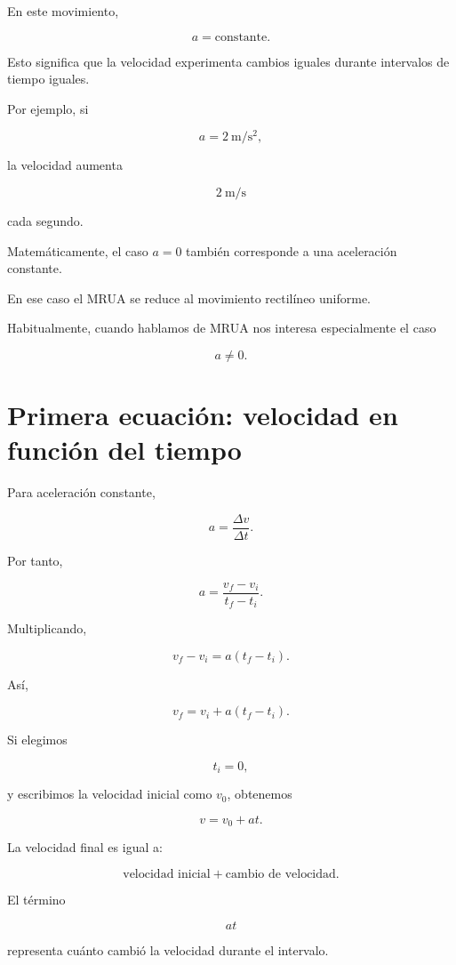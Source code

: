 En este movimiento,

\[ a=\text{constante}. \]

Esto significa que la velocidad experimenta cambios iguales durante
intervalos de tiempo iguales.

Por ejemplo, si

\[ a=\SI{2}{\meter\per\second\squared}, \]

la velocidad aumenta

\[ \SI{2}{\meter\per\second} \]

cada segundo.

\begin{nota}
Matemáticamente, el caso \(a=0\) también corresponde a una aceleración
constante.

En ese caso el MRUA se reduce al movimiento rectilíneo uniforme.

Habitualmente, cuando hablamos de MRUA nos interesa especialmente el caso

\[ a\neq0. \]
\end{nota}


\section{Primera ecuación: velocidad en función del tiempo}

Para aceleración constante,

\[ a=\frac{\Delta v}{\Delta t}. \]

Por tanto,

\[ a=\frac{v_f-v_i}{t_f-t_i}. \]

Multiplicando,

\[ v_f-v_i=a(t_f-t_i). \]

Así,

\[ \boxed{v_f=v_i+a(t_f-t_i)}. \]

Si elegimos

\[ t_i=0, \]

y escribimos la velocidad inicial como \(v_0\), obtenemos

\[ \boxed{v=v_0+at}. \]

\begin{interpretacion}
La velocidad final es igual a:

\[
\text{velocidad inicial}
+
\text{cambio de velocidad}.
\]

El término

\[ at \]

representa cuánto cambió la velocidad durante el intervalo.
\end{interpretacion}


